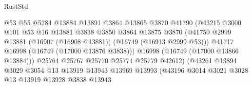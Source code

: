 \begin{lexlean}{RustStd}
\begin{coremodule}
                                        @53
                                        @55
                                        @5784
                                        @13884
                                        @13891
                                        @3864
                                        @13865
                                        @3870
                                        @41790
                                        (@43215
                                          @3000
                                          @101
                                          @53
                                          @16
                                          @13881
                                          @3838
                                          @3850
                                          @3864
                                          @13875
                                          @3870
                                          (@41750
                                            @2999
                                            @13881
                                            (@16907 (@16908 @13881))
                                            (@16749 (@16913 @2999 @53)))
                                          @41717
                                          @16998
                                          (@16749 (@17000 @13876 @3838)))
                                        @16998
                                        (@16749 (@17000 @13866 @13884)))
                                      @25764
                                      @25767
                                      @25770
                                      @25774
                                      @25779
                                      @42612)
                                    (@43261
                                      @13894
                                      @3029
                                      @3054
                                      @13
                                      @13919
                                      @13943
                                      @13969
                                      @13993
                                      (@43196
                                        @3014
                                        @3021
                                        @3028
                                        @13
                                        @13919
                                        @13928
                                        @3838
                                        @13943

\end{coremodule}
\end{lexlean}
